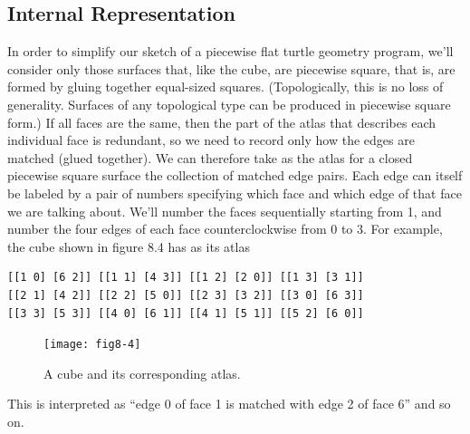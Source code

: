 \documentclass{book}
\begin{document}
\subsection{Internal Representation}

In order to simplify our sketch of a piecewise flat turtle geometry program, we'll consider only those surfaces that, like the cube, are piecewise
square, that is, are formed by gluing together equal-sized squares. (Topologically, this is no loss of generality. Surfaces of any topological type
can be produced in piecewise square form.) If all faces are the same, then
the part of the atlas that describes each individual face is redundant, so
we need to record only how the edges are matched (glued together). We
can therefore take as the atlas for a closed piecewise square surface the
collection of matched edge pairs. Each edge can itself be labeled by a
pair of numbers specifying which face and which edge of that face we
are talking about. We'll number the faces sequentially starting from 1,
and number the four edges of each face counterclockwise from 0 to 3.
For example, the cube shown in figure 8.4 has as its atlas

\begin{verbatim}
[[1 0] [6 2]] [[1 1] [4 3]] [[1 2] [2 0]] [[1 3] [3 1]]
[[2 1] [4 2]] [[2 2] [5 0]] [[2 3] [3 2]] [[3 0] [6 3]]
[[3 3] [5 3]] [[4 0] [6 1]] [[4 1] [5 1]] [[5 2] [6 0]]
\end{verbatim}
\begin{figure}
\begin{center}
\texttt{[image: fig8-4]}
\caption{A cube and its corresponding atlas.}
\end{center}
\end{figure}

This is interpreted as ``edge 0 of face 1 is matched with edge 2 of face 6'' and so on.
\end{document}
